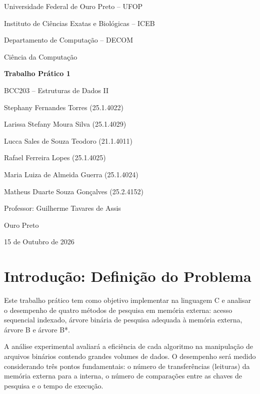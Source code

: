 \documentclass[12pt,a4paper]{article}
\begin{document}
\begin{titlepage}
\centering
{\large Universidade Federal de Ouro Preto -- UFOP\par}
{\large Instituto de Ciências Exatas e Biológicas -- ICEB\par}
{\large Departamento de Computação -- DECOM\par}
{\large Ciência da Computação\par}
\vspace{3cm}
{\LARGE\bfseries Trabalho Prático 1\par}
\vspace{0.4cm}
{\Large BCC203 -- Estruturas de Dados II\par}
\vspace{2cm}
{\large
Stephany Fernandes Torres (25.1.4022)\par
Larissa Stefany Moura Silva (25.1.4029)\par
Lucca Sales de Souza Teodoro (21.1.4011)\par
Rafael Ferreira Lopes (25.1.4025)\par
Maria Luiza de Almeida Guerra (25.1.4024)\par
Matheus Duarte Souza Gonçalves (25.2.4152)\par
\vspace{0.6cm}
Professor: Guilherme Tavares de Assis\par}
\vfill
{\large Ouro Preto\par}
{\large 15 de Outubro de 2026\par}
\end{titlepage}

\tableofcontents
\listoftables
\newpage

\section{Introdução: Definição do Problema}

Este trabalho prático tem como objetivo implementar na linguagem C e analisar o desempenho de quatro métodos de pesquisa em memória externa: acesso sequencial indexado, árvore binária de pesquisa adequada à memória externa, árvore B e árvore B*.

A análise experimental avaliará a eficiência de cada algoritmo na manipulação de arquivos binários contendo grandes volumes de dados. O desempenho será medido considerando três pontos fundamentais: o número de transferências (leituras) da memória externa para a interna, o número de comparações entre as chaves de pesquisa e o tempo de execução.
\end{document}
